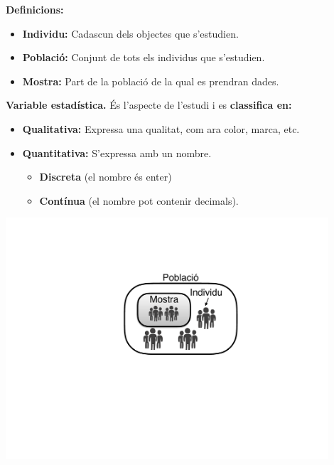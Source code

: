 \begin{theorybox}
 \textbf{Definicions:}

\begin{minipage}{0.7\textwidth}
		\begin{itemize}
	\item \textbf{      Individu: }Cadascun dels objectes que s'estudien.
	
	\item \textbf{      Població: }Conjunt de tots els individus que s'estudien.
	
	\item \textbf{      Mostra:} Part de la població de la qual es prendran dades.
	\end{itemize}

\vspace{0.25cm}

	 \textbf{Variable estadística. }És l'aspecte de l'estudi i es\textbf{ classifica en:}
	\begin{itemize}
		\item \textbf{       Qualitativa:} Expressa una qualitat, com ara color, marca, etc.
		\item \textbf{        Quantitativa: }S'expressa amb un nombre.  
		\begin{itemize}
			\item \textbf{Discreta} (el nombre és enter) 
			\item \textbf{Contínua} (el  nombre pot contenir decimals).
		\end{itemize}
	\end{itemize}
\end{minipage}
\begin{minipage}{0.3\textwidth}
	\centering
	\includegraphics[width=0.9\textwidth]{img-04/mostra}
\end{minipage}





\end{theorybox}
